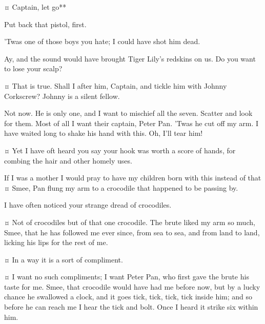\begin{drama}

\starkeyspeaks {}¤
Captain, let go**

\hookspeaks
Put back that pistol, first.

\starkeyspeaks
’Twas one of those boys you hate; I could have shot him dead.

\hookspeaks
Ay, and the sound would have brought Tiger Lily’s redskins on us.
Do you want to lose your scalp?

\smeespeaks {}¤
That is true.
Shall I after him, Captain, and tickle him with Johnny Corkscrew?
Johnny is a silent fellow.

\hookspeaks
Not now.
He is only one, and I want to mischief all the seven.
Scatter and look for them.
Most of all I want their captain, Peter Pan.
’Twas he cut off my arm.
I have waited long to shake his hand with this.
Oh, I'll tear him!

\smeespeaks {}¤
Yet I have oft heard you say your hook was worth a score of hands, for combing the hair and other homely uses.

\hookspeaks
If I was a mother I would pray to have my children born with this instead of that
¤
Smee, Pan flung my arm to a crocodile that happened to be passing by.

\smeespeaks
I have often noticed your strange dread of crocodiles.

\hookspeaks {}¤
Not of crocodiles but of that one crocodile.
The brute liked my arm so much, Smee, that he has followed me ever since, from sea to sea, and from land to land, licking his lips for the rest of me.

\smeespeaks {}¤
In a way it is a sort of compliment.

\hookspeaks {}¤
I want no such compliments; I want Peter Pan, who first gave the brute his taste for me.
Smee, that crocodile would have had me before now, but by a lucky chance he swallowed a clock, and it goes tick, tick, tick, tick inside him; and so before he can reach me I hear the tick and bolt.
Once I heard it strike six within him.


\end{drama}
